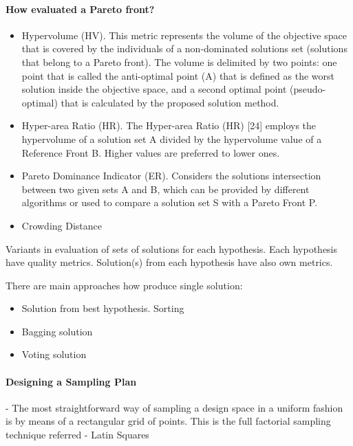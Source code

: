     \paragraph{How evaluated a Pareto front?}
    \begin{itemize}
        \item Hypervolume (HV). 
        This metric represents the volume of the objective space
        that is covered by the individuals of a non-dominated
        solutions set (solutions that belong to a Pareto front). The
        volume is delimited by two points: one point that is called
        the anti-optimal point (A) that is defined as the worst
        solution inside the objective space, and a second optimal
        point (pseudo-optimal) that is calculated by the proposed
        solution method. 
        \item Hyper-area Ratio (HR).
        The Hyper-area Ratio (HR) [24] employs the hypervolume of a solution set A
        divided by the hypervolume value of a Reference Front B. Higher values are
        preferred to lower ones.
        \item Pareto Dominance Indicator (ER). 
        Considers the solutions intersection between two given sets A and B, which can be 
        provided by different algorithms or used to compare a solution set S with a Pareto Front P.
        \item Crowding Distance
        
    \end{itemize}

    Variants in evaluation of sets of solutions for each hypothesis.
    Each hypothesis have quality metrics. Solution(s) from each hypothesis have also own metrics.

    There are main approaches how produce single solution: 
    \begin{itemize}
        \item Solution from best hypothesis. Sorting
        \item Bagging solution
        \item Voting solution                
    \end{itemize}

    \paragraph{Designing a Sampling Plan}
     - The most straightforward way of sampling a design space in a uniform fashion is by \cite{EngSurMod}
     means of a rectangular grid of points. This is the full factorial sampling technique referred
     - Latin Squares